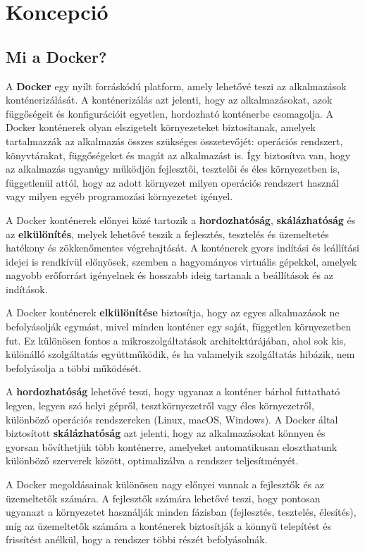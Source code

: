 \chapter{Koncepció}

\section{Mi a Docker?}

A \textbf{Docker} egy nyílt forráskódú platform, amely lehetővé teszi az alkalmazások konténerizálását. A konténerizálás azt jelenti, hogy az alkalmazásokat, azok függőségeit és konfigurációit egyetlen, hordozható konténerbe csomagolja. A Docker konténerek olyan elszigetelt környezeteket biztosítanak, amelyek tartalmazzák az alkalmazás összes szükséges összetevőjét: operációs rendszert, könyvtárakat, függőségeket és magát az alkalmazást is. Így biztosítva van, hogy az alkalmazás ugyanúgy működjön fejlesztői, tesztelői és éles környezetben is, függetlenül attól, hogy az adott környezet milyen operációs rendszert használ vagy milyen egyéb programozási környezetet igényel.

A Docker konténerek előnyei közé tartozik a \textbf{hordozhatóság}, \textbf{skálázhatóság} és az \textbf{elkülönítés}, melyek lehetővé teszik a fejlesztés, tesztelés és üzemeltetés hatékony és zökkenőmentes végrehajtását. A konténerek gyors indítási és leállítási idejei is rendkívül előnyösek, szemben a hagyományos virtuális gépekkel, amelyek nagyobb erőforrást igényelnek és hosszabb ideig tartanak a beállítások és az indítások. 

A Docker konténerek \textbf{elkülönítése} biztosítja, hogy az egyes alkalmazások ne befolyásolják egymást, mivel minden konténer egy saját, független környezetben fut. Ez különösen fontos a mikroszolgáltatások architektúrájában, ahol sok kis, különálló szolgáltatás együttműködik, és ha valamelyik szolgáltatás hibázik, nem befolyásolja a többi működését.

A \textbf{hordozhatóság} lehetővé teszi, hogy ugyanaz a konténer bárhol futtatható legyen, legyen szó helyi gépről, tesztkörnyezetről vagy éles környezetről, különböző operációs rendszereken (Linux, macOS, Windows). A Docker által biztosított \textbf{skálázhatóság} azt jelenti, hogy az alkalmazásokat könnyen és gyorsan bővíthetjük több konténerre, amelyeket automatikusan eloszthatunk különböző szerverek között, optimalizálva a rendszer teljesítményét.

A Docker megoldásainak különösen nagy előnyei vannak a fejlesztők és az üzemeltetők számára. A fejlesztők számára lehetővé teszi, hogy pontosan ugyanazt a környezetet használják minden fázisban (fejlesztés, tesztelés, élesítés), míg az üzemeltetők számára a konténerek biztosítják a könnyű telepítést és frissítést anélkül, hogy a rendszer többi részét befolyásolnák.

